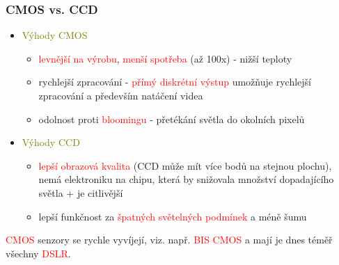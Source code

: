\documentclass{beamer}
\begin{document}
	\begin{frame}[t,fragile]
		\frametitle{CMOS vs. CCD}					
		\begin{itemize}
	    	\item \textcolor{olive}{Výhody CMOS}				
	    	\begin{itemize}
				\item \textcolor{red}{levnější na výrobu}, \textcolor{red}{menší spotřeba} (až 100x) - nižší teploty
				\item rychlejší zpracování - \textcolor{red}{přímý diskrétní výstup} umožňuje rychlejší zpracování a především natáčení videa
				\item odolnost proti \textcolor{red}{bloomingu} - přetékání světla do okolních pixelů
	    	\end{itemize}

			\item \textcolor{olive}{Výhody CCD}
			\begin{itemize}
				\item \textcolor{red}{lepší obrazová kvalita} (CCD může mít více bodů na stejnou plochu), nemá elektroniku na chipu, která by snižovala množství dopadajícího světla + je citlivější
				\item lepší funkčnost za \textcolor{red}{špatných světelných podmínek} a méně šumu
				
			\end{itemize}
		\end{itemize}	
		
		\textcolor{red}{CMOS} senzory se rychle vyvíjejí, viz. např. \textcolor{red}{BIS CMOS} a mají je dnes téměř všechny \textcolor{red}{DSLR}.
	\end{frame}
	
	
\end{document}
